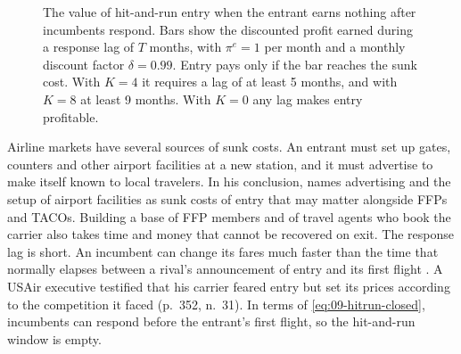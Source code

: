 \begin{figure}[htbp]
\centering
{}
\caption{The value of hit-and-run entry when the entrant earns nothing after incumbents respond. Bars show the
discounted profit earned during a response lag of $T$ months, with $\pi^e = 1$ per month and a monthly discount
factor $\delta = 0.99$. Entry pays only if the bar reaches the sunk cost. With $K = 4$ it requires a lag of at
least 5 months, and with $K = 8$ at least 9 months. With $K = 0$ any lag makes entry profitable.}
\label{fig:09-hitrun}
\end{figure}

Airline markets have several sources of sunk costs. An entrant must set up gates, counters and other airport
facilities at a new station, and it must advertise to make itself known to local travelers. In his conclusion,
\citet[p.~362]{Borenstein1989} names advertising and the setup of airport facilities as sunk costs of entry
that may matter alongside FFPs and TACOs. Building a base of FFP members and of travel agents who book the
carrier also takes time and money that cannot be recovered on exit. The response lag is short. An incumbent
can change its fares much faster than the time that normally elapses between a rival's announcement of entry
and its first flight \citep[p.~352]{Borenstein1989}. A USAir executive testified that his carrier feared entry
but set its prices according to the competition it faced (p.~352, n.~31). In terms of
\eqref{eq:09-hitrun-closed}, incumbents can respond before the entrant's first flight, so the hit-and-run window
is empty.

